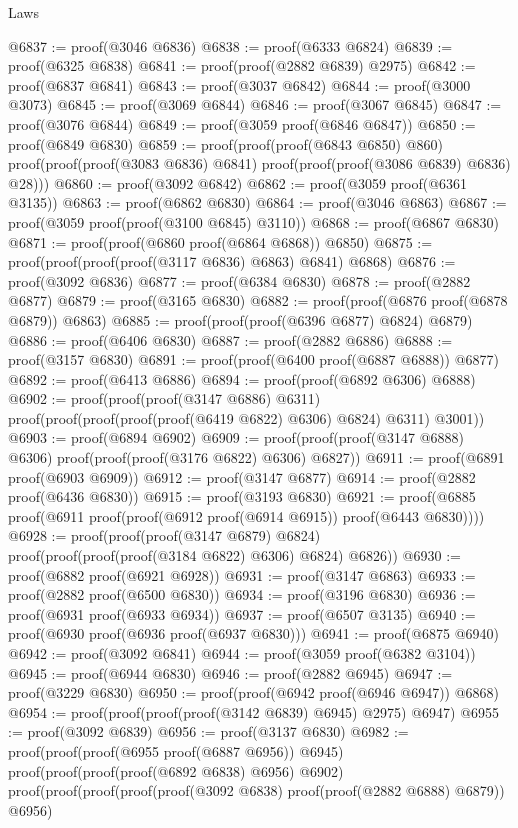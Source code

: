 \begin{lexlean}{Laws}
\begin{coremodule}
@6837 := proof(@3046 @6836)
@6838 := proof(@6333 @6824)
@6839 := proof(@6325 @6838)
@6841 := proof(proof(@2882 @6839) @2975)
@6842 := proof(@6837 @6841)
@6843 := proof(@3037 @6842)
@6844 := proof(@3000 @3073)
@6845 := proof(@3069 @6844)
@6846 := proof(@3067 @6845)
@6847 := proof(@3076 @6844)
@6849 := proof(@3059 proof(@6846 @6847))
@6850 := proof(@6849 @6830)
@6859 := proof(proof(proof(@6843 @6850) @860)
      proof(proof(proof(@3083 @6836) @6841) proof(proof(proof(@3086 @6839) @6836) @28)))
@6860 := proof(@3092 @6842)
@6862 := proof(@3059 proof(@6361 @3135))
@6863 := proof(@6862 @6830)
@6864 := proof(@3046 @6863)
@6867 := proof(@3059 proof(proof(@3100 @6845) @3110))
@6868 := proof(@6867 @6830)
@6871 := proof(proof(@6860 proof(@6864 @6868)) @6850)
@6875 := proof(proof(proof(proof(@3117 @6836) @6863) @6841) @6868)
@6876 := proof(@3092 @6836)
@6877 := proof(@6384 @6830)
@6878 := proof(@2882 @6877)
@6879 := proof(@3165 @6830)
@6882 := proof(proof(@6876 proof(@6878 @6879)) @6863)
@6885 := proof(proof(proof(@6396 @6877) @6824) @6879)
@6886 := proof(@6406 @6830)
@6887 := proof(@2882 @6886)
@6888 := proof(@3157 @6830)
@6891 := proof(proof(@6400 proof(@6887 @6888)) @6877)
@6892 := proof(@6413 @6886)
@6894 := proof(proof(@6892 @6306) @6888)
@6902 := proof(proof(proof(@3147 @6886) @6311)
      proof(proof(proof(proof(proof(@6419 @6822) @6306) @6824) @6311) @3001))
@6903 := proof(@6894 @6902)
@6909 := proof(proof(proof(@3147 @6888) @6306) proof(proof(proof(@3176 @6822) @6306) @6827))
@6911 := proof(@6891 proof(@6903 @6909))
@6912 := proof(@3147 @6877)
@6914 := proof(@2882 proof(@6436 @6830))
@6915 := proof(@3193 @6830)
@6921 := proof(@6885 proof(@6911 proof(proof(@6912 proof(@6914 @6915)) proof(@6443 @6830))))
@6928 := proof(proof(proof(@3147 @6879) @6824)
      proof(proof(proof(proof(@3184 @6822) @6306) @6824) @6826))
@6930 := proof(@6882 proof(@6921 @6928))
@6931 := proof(@3147 @6863)
@6933 := proof(@2882 proof(@6500 @6830))
@6934 := proof(@3196 @6830)
@6936 := proof(@6931 proof(@6933 @6934))
@6937 := proof(@6507 @3135)
@6940 := proof(@6930 proof(@6936 proof(@6937 @6830)))
@6941 := proof(@6875 @6940)
@6942 := proof(@3092 @6841)
@6944 := proof(@3059 proof(@6382 @3104))
@6945 := proof(@6944 @6830)
@6946 := proof(@2882 @6945)
@6947 := proof(@3229 @6830)
@6950 := proof(proof(@6942 proof(@6946 @6947)) @6868)
@6954 := proof(proof(proof(proof(@3142 @6839) @6945) @2975) @6947)
@6955 := proof(@3092 @6839)
@6956 := proof(@3137 @6830)
@6982 := proof(proof(proof(@6955 proof(@6887 @6956)) @6945)
      proof(proof(proof(proof(@6892 @6838) @6956) @6902)
          proof(proof(proof(proof(proof(@3092 @6838) proof(proof(@2882 @6888) @6879)) @6956)

\end{coremodule}
\end{lexlean}
